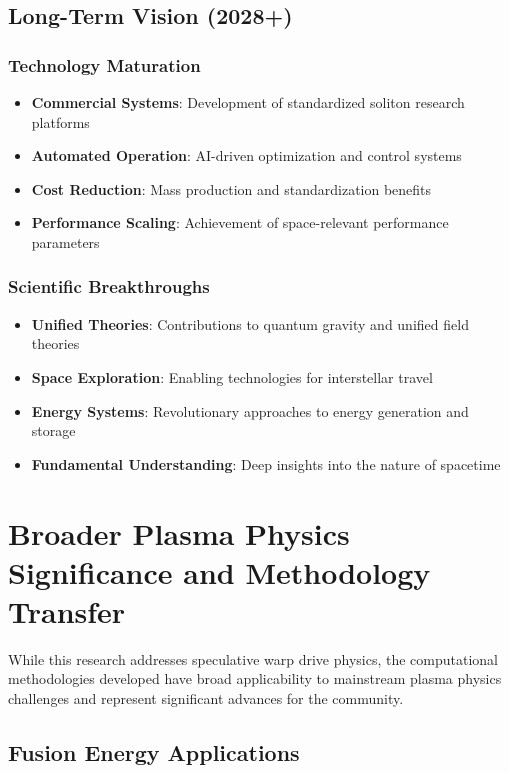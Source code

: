 \documentclass[10pt,twocolumn]{article}
\begin{document}
\subsection{Long-Term Vision (2028+)}

\subsubsection{Technology Maturation}
\begin{itemize}
\item \textbf{Commercial Systems}: Development of standardized soliton research platforms
\item \textbf{Automated Operation}: AI-driven optimization and control systems
\item \textbf{Cost Reduction}: Mass production and standardization benefits
\item \textbf{Performance Scaling}: Achievement of space-relevant performance parameters
\end{itemize}

\subsubsection{Scientific Breakthroughs}
\begin{itemize}
\item \textbf{Unified Theories}: Contributions to quantum gravity and unified field theories
\item \textbf{Space Exploration}: Enabling technologies for interstellar travel
\item \textbf{Energy Systems}: Revolutionary approaches to energy generation and storage
\item \textbf{Fundamental Understanding}: Deep insights into the nature of spacetime
\end{itemize}

\section{Broader Plasma Physics Significance and Methodology Transfer}

While this research addresses speculative warp drive physics, the computational methodologies developed have broad applicability to mainstream plasma physics challenges and represent significant advances for the community.

\subsection{Fusion Energy Applications}
\end{document}
